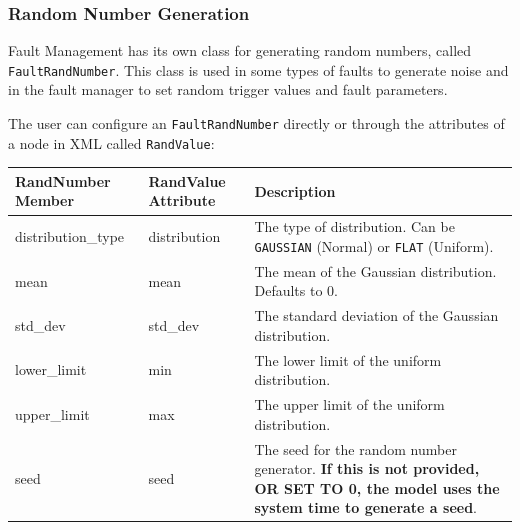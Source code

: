 \documentclass[11pt,fleqn]{report}
\begin{document}
\subsubsection {Random Number Generation}\label{sec:UG:random_node}
Fault Management has its own class for generating random numbers, called
\verb"FaultRandNumber".
This class is used in some types of faults to generate noise and in the fault
manager to set random trigger values and fault parameters.

\par The user can configure an \verb"FaultRandNumber" directly or through the
attributes of a node in XML called \verb"RandValue":
\begin{center}\begin{tabular}{|p{3.1cm}|p{2.4cm}|p{8.5cm}|} \hline
\textbf{RandNumber Member} & \textbf{RandValue Attribute} & \textbf{Description}
\\ \hline
distribution\_type & distribution & The type of distribution. Can be
\verb"GAUSSIAN" (Normal) or \verb"FLAT" (Uniform). \\ \hline
mean & mean & The mean of the Gaussian distribution. Defaults to 0. \\ \hline
std\_dev & std\_dev & The standard deviation of the Gaussian distribution. \\
\hline
lower\_limit & min & The lower limit of the uniform distribution. \\ \hline
upper\_limit & max & The upper limit of the uniform distribution. \\ \hline
seed & seed & The seed for the random number generator. \textbf{
              If this is not provided, OR SET TO 0, the model uses the
              system time to generate a seed}. \\ \hline
\end{tabular}\end{center}
\end{document}
